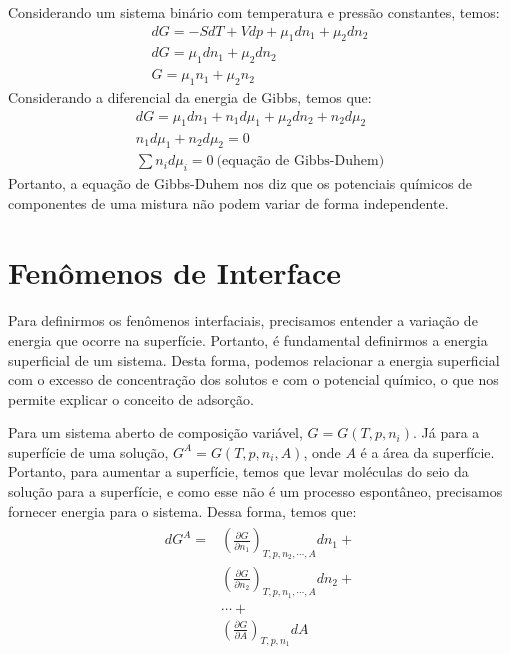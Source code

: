 \begin{multicols*}{2}
  \begin{definition}
    Considerando um sistema binário com temperatura e pressão constantes, temos:
    \begin{gather}
      dG = -SdT + Vdp + \mu_1 dn_1 + \mu_2 dn_2 \\
      dG = \mu_1 dn_1 + \mu_2 dn_2 \\
      G = \mu_1 n_1 + \mu_2 n_2
    \end{gather}
    Considerando a diferencial da energia de Gibbs, temos que:
    \begin{gather}
      dG = \mu_1 dn_1 + n_1 d\mu_1 + \mu_2 dn_2 + n_2 d\mu_2 \\
      n_1 d\mu_1 + n_2 d\mu_2 = 0 \\
      \sum n_i d\mu_i = 0 \ \text{(equação de Gibbs-Duhem)}
    \end{gather}
    Portanto, a equação de Gibbs-Duhem nos diz que os potenciais químicos de componentes de uma mistura não podem variar de forma independente.
  \end{definition}

  \section*{Fenômenos de Interface}

  \paragraph{ } Para definirmos os fenômenos interfaciais, precisamos entender a variação de energia que ocorre na superfície. Portanto, é fundamental definirmos a energia superficial de um sistema. Desta forma, podemos relacionar a energia superficial com o excesso de concentração dos solutos e com o potencial químico, o que nos permite explicar o conceito de adsorção.

  \begin{definition}
    Para um sistema aberto de composição variável, $G = G(T,p,n_i)$. Já para a superfície de uma solução, $G^{A}=G(T,p,n_i,A)$, onde $A$ é a área da superfície. Portanto, para aumentar a superfície, temos que levar moléculas do seio da solução para a superfície, e como esse não é um processo espontâneo, precisamos fornecer energia para o sistema. Dessa forma, temos que:
    \begin{gather}
      \begin{align}
        dG^{A} = & \left( \frac{\partial G}{\partial n_1}  \right)_{T,p,n_2, \cdots,A} dn_1 + \\
               & \left( \frac{\partial G}{\partial n_2}  \right)_{T,p,n_1,\cdots,A} dn_2 + \\
               & \cdots + \\
               & \left( \frac{\partial G}{\partial A} \right)_{T,p,n_1} dA
      \end{align}
    \end{gather}


\end{definition}
\end{multicols*}
